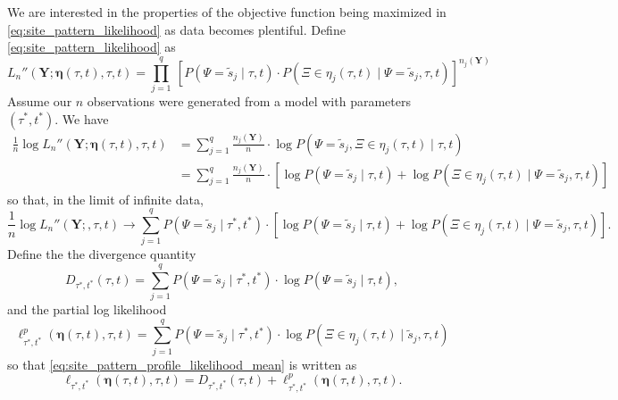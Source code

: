\documentclass[a4paper]{article}
\newcommand{\fullAlignment}{\mathbf{Y}}
\newcommand{\siteSplit}{\tilde{s}}
\newcommand{\ancestralSplitPartition}{\eta}
\newcommand{\fullAncestralSplitPartitions}{\boldsymbol\eta}
\newcommand{\siteSplitRV}{\Psi}
\newcommand{\ancestralSplitRV}{\Xi}
\newcommand{\nCols}{n}
\newcommand{\nSiteSplits}{q}
\newcommand{\shannonDivergence}{D}
\begin{document}
We are interested in the properties of the objective function being maximized in \eqref{eq:site_pattern_likelihood} as data becomes plentiful.
Define \eqref{eq:site_pattern_likelihood} as
$$
L_\nCols''(\fullAlignment;\fullAncestralSplitPartitions(\tau, t),\tau,t) = \prod_{j=1}^{\nSiteSplits} \ \left[P(\siteSplitRV=\siteSplit_j \mid \tau, t) \cdot P(\ancestralSplitRV\in\ancestralSplitPartition_j(\tau, t) \mid \siteSplitRV=\siteSplit_j, \tau, t)\right] ^{\nCols_j(\fullAlignment)} \label{eq:site_pattern_likelihood}
$$
Assume our $\nCols$ observations were generated from a model with parameters $(\tau^*, t^*)$.
We have
\begin{align}
    \frac{1}{\nCols} \log L_\nCols''(\fullAlignment;\fullAncestralSplitPartitions(\tau,t),\tau,t)
        &= \sum_{j=1}^\nSiteSplits \frac{\nCols_j(\fullAlignment)}{\nCols}\cdot  \log P(\siteSplitRV=\siteSplit_j, \ancestralSplitRV\in\ancestralSplitPartition_j(\tau, t) \mid \tau, t) \\
        &= \sum_{j=1}^\nSiteSplits \frac{\nCols_j(\fullAlignment)}{\nCols}\cdot [\log P(\siteSplitRV=\siteSplit_j \mid \tau, t) +
            \log P(\ancestralSplitRV\in\ancestralSplitPartition_j(\tau, t) \mid \siteSplitRV=\siteSplit_j , \tau, t)]
\end{align}
so that, in the limit of infinite data,
\begin{equation}
\frac{1}{\nCols} \log L_\nCols''(\fullAlignment;,\tau,t) \rightarrow \sum_{j=1}^\nSiteSplits P(\siteSplitRV=\siteSplit_j \mid \tau^*, t^*) \cdot [\log P(\siteSplitRV=\siteSplit_j \mid \tau, t) + \log P(\ancestralSplitRV\in\ancestralSplitPartition_j(\tau, t) \mid \siteSplitRV=\siteSplit_j , \tau, t)]. \label{eq:site_pattern_profile_likelihood_mean}
\end{equation}
Define the the divergence quantity
$$
\shannonDivergence_{\tau^*,t^*}(\tau,t) = \sum_{j=1}^\nSiteSplits P(\siteSplitRV=\siteSplit_j \mid \tau^*, t^*)\cdot\log P(\siteSplitRV=\siteSplit_j \mid \tau, t),
$$
and the partial log likelihood
$$
\ell^p_{\tau^*,t^*}(\fullAncestralSplitPartitions(\tau,t),\tau,t) = \sum_{j=1}^\nSiteSplits P(\siteSplitRV=\siteSplit_j \mid \tau^*, t^*)\cdot\log P(\ancestralSplitRV\in\ancestralSplitPartition_j(\tau, t) \mid \siteSplit_j, \tau, t)
$$
so that \eqref{eq:site_pattern_profile_likelihood_mean} is written as
\begin{equation}
    \label{eq:log_likelihood_simplified}
    \ell_{\tau^*,t^*}(\fullAncestralSplitPartitions(\tau,t),\tau,t) = \shannonDivergence_{\tau^*,t^*}(\tau,t) + \ell^p_{\tau^*,t^*}(\fullAncestralSplitPartitions(\tau,t),\tau,t).
\end{equation}
\end{document}
